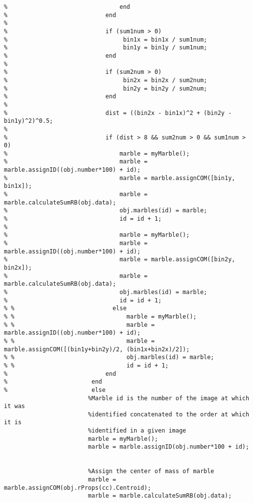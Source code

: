 \documentclass[10pt,a4paper,onecolumn]{report}
\begin{document}
\begin{lstlisting}
%                                end 
%                            end
%                            
%                            if (sum1num > 0)
%                                 bin1x = bin1x / sum1num;
%                                 bin1y = bin1y / sum1num;
%                            end
%                            
%                            if (sum2num > 0)
%                                 bin2x = bin2x / sum2num;
%                                 bin2y = bin2y / sum2num;
%                            end
%                           
%                            dist = ((bin2x - bin1x)^2 + (bin2y - bin1y)^2)^0.5;
%                            
%                            if (dist > 8 && sum2num > 0 && sum1num > 0)
%                                marble = myMarble();
%                                marble = marble.assignID((obj.number*100) + id);
%                                marble = marble.assignCOM([bin1y, bin1x]);
%                                marble = marble.calculateSumRB(obj.data);
%                                obj.marbles(id) = marble;
%                                id = id + 1;
% 
%                                marble = myMarble();
%                                marble = marble.assignID((obj.number*100) + id);
%                                marble = marble.assignCOM([bin2y, bin2x]);
%                                marble = marble.calculateSumRB(obj.data);
%                                obj.marbles(id) = marble;
%                                id = id + 1;   
% %                            else
% %                                marble = myMarble();
% %                                marble = marble.assignID((obj.number*100) + id);
% %                                marble = marble.assignCOM([(bin1y+bin2y)/2, (bin1x+bin2x)/2]);
% %                                obj.marbles(id) = marble;
% %                                id = id + 1;
%                            end
%                        end
%                        else
                        %Marble id is the number of the image at which it was
                        %identified concatenated to the order at which it is
                        %identified in a given image
                        marble = myMarble();
                        marble = marble.assignID(obj.number*100 + id);


                        %Assign the center of mass of marble
                        marble = marble.assignCOM(obj.rProps(cc).Centroid);
                        marble = marble.calculateSumRB(obj.data);


\end{lstlisting}
\end{document}
